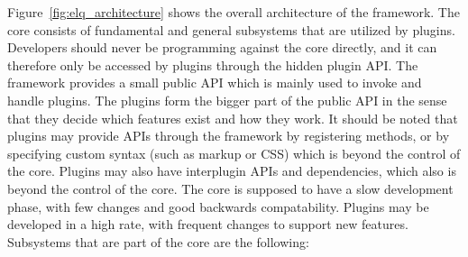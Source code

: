 \documentclass[a4paper,11pt]{kth-mag}
\begin{document}
        Figure~\ref{fig:elq_architecture} shows the overall architecture of the framework.
        The core consists of fundamental and general subsystems that are utilized by plugins.
        Developers should never be programming against the core directly, and it can therefore only be accessed by plugins through the hidden plugin \gls{API}.
        The framework provides a small public \gls{API} which is mainly used to invoke and handle plugins.
        The plugins form the bigger part of the public \gls{API} in the sense that they decide which features exist and how they work.
        It should be noted that plugins may provide \glspl{API} through the framework by registering methods, or by specifying custom syntax (such as markup or \gls{CSS}) which is beyond the control of the core.
        Plugins may also have interplugin \glspl{API} and dependencies, which also is beyond the control of the core.
        The core is supposed to have a slow development phase, with few changes and good backwards compatability.
        Plugins may be developed in a high rate, with frequent changes to support new features.
        Subsystems that are part of the core are the following:
\end{document}

